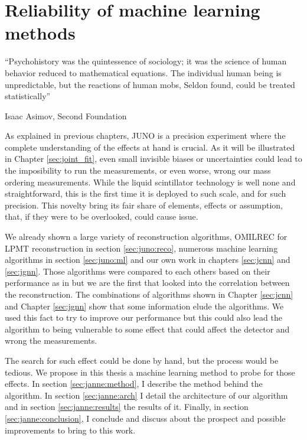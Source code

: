\documentclass[../main.tex]{subfiles}
\begin{document}
\chapter{Reliability of machine learning methods}
\label{sec:janne}

\epigraph{``Psychohistory was the quintessence of sociology; it was the science of human behavior reduced to mathematical equations. The individual human being is unpredictable, but the reactions of human mobs, Seldon found, could be treated statistically''}{Isaac Asimov, Second Foundation}

\minitoc

As explained in previous chapters, JUNO is a precision experiment where the complete understanding of the effects at hand is crucial. As it will be illustrated in Chapter \ref{sec:joint_fit}, even small invisible biases or uncertainties could lead to the imposibility to run the measurements, or even worse, wrong our mass ordering measurements. While the liquid scintillator technology is well none and straightforward, this is the first time it is deployed to such scale, and for such precision. This novelty bring its fair share of elements, effects or assumption, that, if they were to be overlooked, could cause issue.

We already shown a large variety of reconstruction algorithms, OMILREC for LPMT reconstruction in section \ref{sec:juno:reco}, numerous machine learning algorithms in section \ref{sec:juno:ml} and our own work in chapters \ref{sec:jcnn} and \ref{sec:jgnn}. Those algorithms were compared to each others based on their performance as in \cite{qian_vertex_2021} but we are the first that looked into the correlation between the reconstruction. The combinations of algorithms shown in Chapter \ref{sec:jcnn} and Chapter \ref{sec:jgnn} show that some information elude the algorithms. We used this fact to try to improve our performance but this could also lead the algorithm to being vulnerable to some effect that could affect the detector and wrong the measurements.

The search for such effect could be done by hand, but the process would be tedious. We propose in this thesis a machine learning method to probe for those effects.  In section \ref{sec:janne:method}, I describe the method behind the algorithm. In section \ref{sec:janne:arch} I detail the architecture of our algorithm and in section \ref{sec:janne:results} the results of it. Finally, in section \ref{sec:janne:conclusion}, I conclude and discuss about the prospect and possible improvements to bring to this work.
\end{document}
